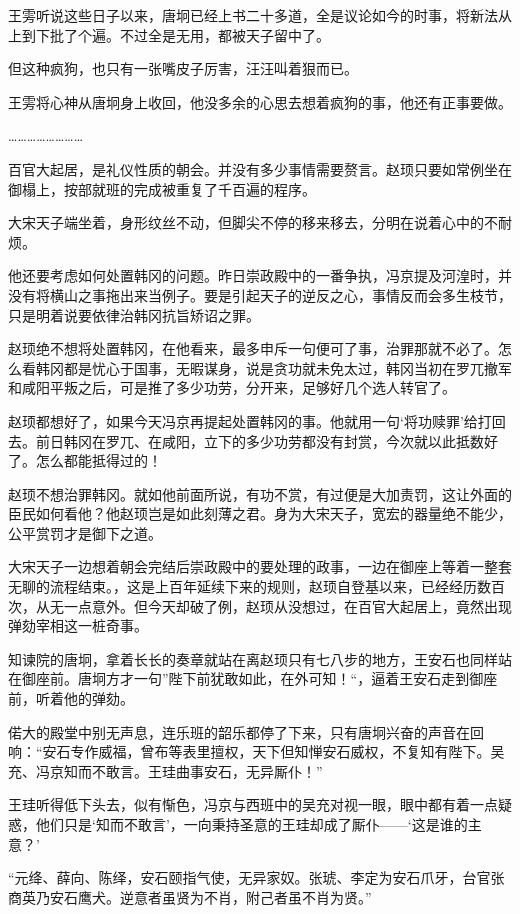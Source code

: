王雱听说这些日子以来，唐坰已经上书二十多道，全是议论如今的时事，将新法从上到下批了个遍。不过全是无用，都被天子留中了。

但这种疯狗，也只有一张嘴皮子厉害，汪汪叫着狠而已。

王雱将心神从唐坰身上收回，他没多余的心思去想着疯狗的事，他还有正事要做。

……………………

百官大起居，是礼仪性质的朝会。并没有多少事情需要赘言。赵顼只要如常例坐在御榻上，按部就班的完成被重复了千百遍的程序。

大宋天子端坐着，身形纹丝不动，但脚尖不停的移来移去，分明在说着心中的不耐烦。

他还要考虑如何处置韩冈的问题。昨日崇政殿中的一番争执，冯京提及河湟时，并没有将横山之事拖出来当例子。要是引起天子的逆反之心，事情反而会多生枝节，只是明着说要依律治韩冈抗旨矫诏之罪。

赵顼绝不想将处置韩冈，在他看来，最多申斥一句便可了事，治罪那就不必了。怎么看韩冈都是忧心于国事，无暇谋身，说是贪功就未免太过，韩冈当初在罗兀撤军和咸阳平叛之后，可是推了多少功劳，分开来，足够好几个选人转官了。

赵顼都想好了，如果今天冯京再提起处置韩冈的事。他就用一句‘将功赎罪’给打回去。前日韩冈在罗兀、在咸阳，立下的多少功劳都没有封赏，今次就以此抵数好了。怎么都能抵得过的！

赵顼不想治罪韩冈。就如他前面所说，有功不赏，有过便是大加责罚，这让外面的臣民如何看他？他赵顼岂是如此刻薄之君。身为大宋天子，宽宏的器量绝不能少，公平赏罚才是御下之道。

大宋天子一边想着朝会完结后崇政殿中的要处理的政事，一边在御座上等着一整套无聊的流程结束。，这是上百年延续下来的规则，赵顼自登基以来，已经经历数百次，从无一点意外。但今天却破了例，赵顼从没想过，在百官大起居上，竟然出现弹劾宰相这一桩奇事。

知谏院的唐坰，拿着长长的奏章就站在离赵顼只有七八步的地方，王安石也同样站在御座前。唐坰方才一句”陛下前犹敢如此，在外可知！“，逼着王安石走到御座前，听着他的弹劾。

偌大的殿堂中别无声息，连乐班的韶乐都停了下来，只有唐坰兴奋的声音在回响：“安石专作威福，曾布等表里擅权，天下但知惮安石威权，不复知有陛下。吴充、冯京知而不敢言。王珪曲事安石，无异厮仆！”

王珪听得低下头去，似有惭色，冯京与西班中的吴充对视一眼，眼中都有着一点疑惑，他们只是‘知而不敢言’，一向秉持圣意的王珪却成了厮仆——‘这是谁的主意？’

“元绛、薛向、陈绎，安石颐指气使，无异家奴。张琥、李定为安石爪牙，台官张商英乃安石鹰犬。逆意者虽贤为不肖，附己者虽不肖为贤。”

